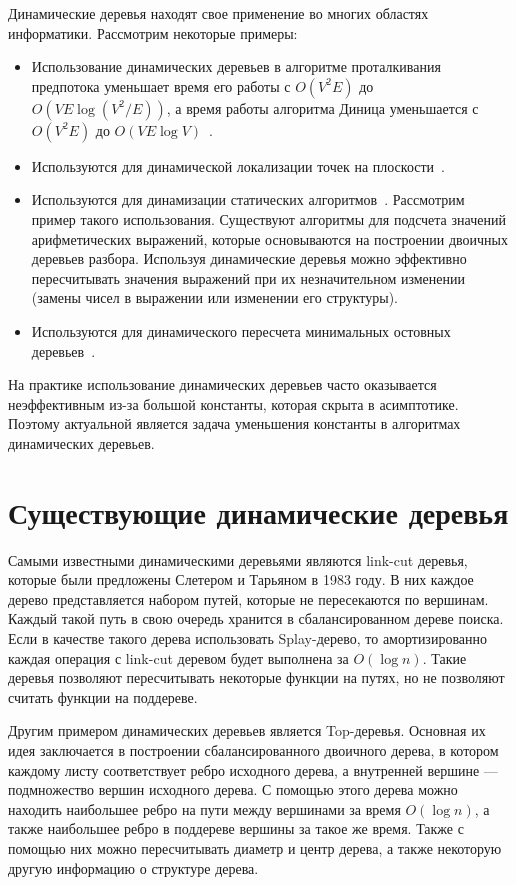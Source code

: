 Динамические деревья находят свое применение во многих областях информатики. Рассмотрим некоторые примеры:
\begin{itemize}
\item Использование динамических деревьев в алгоритме проталкивания предпотока уменьшает время его работы с 
$O(V^2 E)$ до $O(VE \log (V^2 / E))$, а время работы алгоритма Диница уменьшается с $O(V^2 E)$ до $O(VE \log V)$~\cite{tarj83}.
\item Используются для динамической локализации точек на плоскости~\cite{loca91}.
\item Используются для динамизации статических алгоритмов~\cite{acar05}. Рассмотрим пример такого использования. 
Существуют алгоритмы для подсчета значений арифметических выражений, которые основываются на построении двоичных деревьев разбора. 
Используя динамические деревья можно эффективно пересчитывать значения выражений при их незначительном изменении
(замены чисел в выражении или изменении его структуры).
\item Используются для динамического пересчета минимальных остовных деревьев~\cite{fred85}.
\end{itemize}

На практике использование динамических деревьев часто оказывается неэффективным из-за большой константы,
которая скрыта в асимптотике. Поэтому актуальной является задача уменьшения константы в алгоритмах динамических деревьев.
                                                                                                                                                                 
\FloatBarrier

\section{Существующие динамические деревья}

Самыми известными динамическими деревьями являются link-cut деревья, которые были предложены Слетером и Тарьяном в 1983 году. 
В них каждое дерево представляется набором путей, которые не пересекаются по вершинам. Каждый такой путь в свою очередь хранится в сбалансированном дереве поиска.
Если в качестве такого дерева использовать Splay-дерево, то амортизированно каждая операция с link-cut деревом будет выполнена за $O(\log n)$.
Такие деревья позволяют пересчитывать некоторые функции на путях, но не позволяют считать функции на поддереве.

Другим примером динамических деревьев является Top-деревья. Основная их идея заключается в построении сбалансированного двоичного дерева, в котором каждому листу соответствует ребро исходного дерева,
а внутренней вершине --- подмножество вершин исходного дерева.
С помощью этого дерева можно находить наибольшее ребро на пути между вершинами за время $O(\log n)$, а также наибольшее ребро в поддереве вершины за такое же время.
Также с помощью них можно пересчитывать диаметр и центр дерева, а также некоторую другую информацию о структуре дерева.

